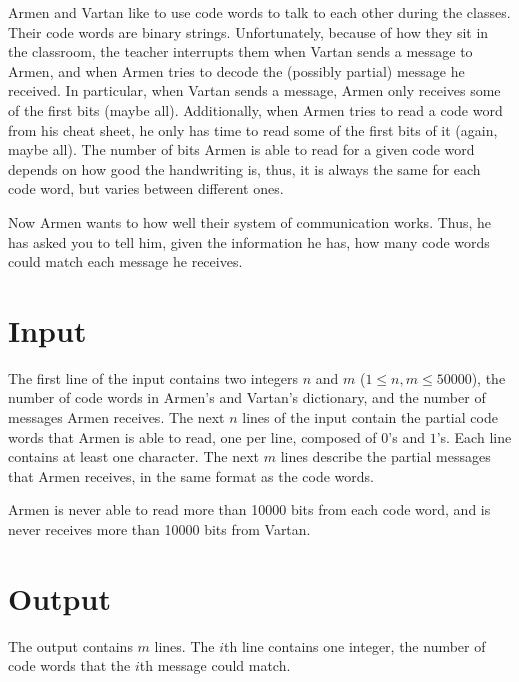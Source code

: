
Armen and Vartan like to use code words to talk to each other during the classes.
Their code words are binary strings.
Unfortunately, because of how they sit in the classroom, the teacher interrupts them when Vartan sends a message to Armen, and when Armen tries to decode the (possibly partial) message he received.
In particular, when Vartan sends a message, Armen only receives some of the first bits (maybe all).
Additionally, when Armen tries to read a code word from his cheat sheet, he only has time to read some of the first bits of it (again, maybe all).
The number of bits Armen is able to read for a given code word depends on how good the handwriting is, thus, it is always the same for each code word, but varies between different ones.

Now Armen wants to how well their system of communication works.
Thus, he has asked you to tell him, given the information he has, how many code words could match each message he receives.

\section*{Input}
The first line of the input contains two integers $n$ and $m$ ($1 \leq n, m \leq 50000$), the number of code words in Armen's and Vartan's dictionary, and the number of messages Armen receives.
The next $n$ lines of the input contain the partial code words that Armen is able to read, one per line, composed of $0$'s and $1$'s.
Each line contains at least one character.
The next $m$ lines describe the partial messages that Armen receives, in the same format as the code words.

Armen is never able to read more than 10000 bits from each code word, and is never receives more than 10000 bits from Vartan.

\section*{Output}
The output contains $m$ lines.
The $i$th line contains one integer, the number of code words that the $i$th message could match.
